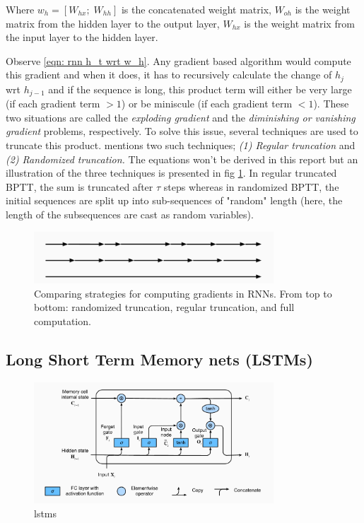 \documentclass[12pt, letterpaper]{article}
\begin{document}
Where $w_h = [W_{hx};\; W_{hh}]$ is the concatenated weight matrix, 
$W_{oh}$ is the weight matrix from the hidden layer to the output layer, 
$W_{hx}$ is the weight matrix from the input layer to the hidden layer.

Observe \ref{eqn: rnn h_t wrt w_h}. Any gradient based algorithm would compute
this gradient and when it does, it has to recursively calculate the change of 
$h_j$ wrt $h_{j-1}$ and if the sequence is long, this product term will 
either be very large (if each gradient term $>1$) or be miniscule (if each gradient 
term $<1$). These two situations are called the \textit{exploding gradient} and 
the \textit{diminishing or vanishing gradient} problems, respectively. To solve
this issue, several techniques are used to truncate this product. \cite{zhang2023dive}
mentions two such techniques; \textit{(1) Regular truncation} and \textit{(2) Randomized
truncation.} The equations won't be derived in this report but an illustration of 
the three techniques is presented in fig \ref{fig: truncated_bptt}. In regular 
truncated BPTT, the sum is truncated after $\tau$ steps whereas in 
randomized BPTT, the initial sequences are split up into sub-sequences 
of "random" length (here, the length of the subsequences are cast as random
variables). \cite{tallec2017unbiasing}

\begin{figure}[htpb]
    \centering
    \includegraphics[width=0.8\textwidth]{techniques for truncated bptt.png}
    \caption{Comparing strategies for computing gradients in RNNs. From top to bottom: randomized truncation, regular truncation, and full computation.}
    \label{fig: truncated_bptt}
\end{figure}

\subsection{Long Short Term Memory nets (LSTMs)}

\begin{figure}[htpb]
    \centering
    \includegraphics[width=0.8\textwidth]{lstms v1.png}
    \caption{lstms}
    \label{fig: lstms}
\end{figure}
\end{document}
